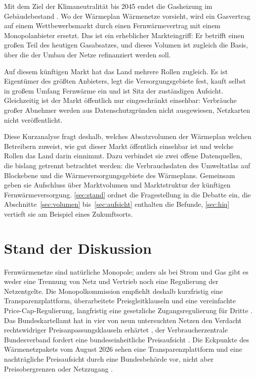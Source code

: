 \documentclass[11pt,DIV=13,a4paper,parskip=half,abstract=true,ngerman]{scrartcl}
\begin{document}
Mit dem Ziel der Klimaneutralität bis 2045 endet die Gasheizung im Gebäudebestand \parencite{herpich2023}.
Wo der Wärmeplan Wärmenetze vorsieht, wird ein Gasvertrag auf einem Wettbewerbsmarkt durch einen Fernwärmevertrag mit einem Monopolanbieter ersetzt.
Das ist ein erheblicher Markteingriff: Er betrifft einen großen Teil des heutigen Gasabsatzes, und dieses Volumen ist zugleich die Basis, über die der Umbau der Netze refinanziert werden soll.

Auf diesem künftigen Markt hat das Land mehrere Rollen zugleich.
Es ist Eigentümer des größten Anbieters, legt die Versorgungsgebiete fest, kauft selbst in großem Umfang Fernwärme ein und ist Sitz der zuständigen Aufsicht.
Gleichzeitig ist der Markt öffentlich nur eingeschränkt einsehbar: Verbräuche großer Abnehmer werden aus Datenschutzgründen nicht ausgewiesen, Netzkarten nicht veröffentlicht.

Diese Kurzanalyse fragt deshalb, welches Absatzvolumen der Wärmeplan welchen Betreibern zuweist, wie gut dieser Markt öffentlich einsehbar ist und welche Rollen das Land darin einnimmt.
Dazu verbindet sie zwei offene Datenquellen, die bislang getrennt betrachtet werden: die Verbrauchsdaten des Umweltatlas auf Blockebene und die Wärmeversorgungsgebiete des Wärmeplans.
Gemeinsam geben sie Aufschluss über Marktvolumen und Marktstruktur der künftigen Fernwärmeversorgung.
\autoref{sec:stand} ordnet die Fragestellung in die Debatte ein, die Abschnitte~\ref{sec:volumen} bis~\ref{sec:aufsicht} enthalten die Befunde, \autoref{sec:hiq} vertieft sie am Beispiel eines Zukunftsorts.

\section{Stand der Diskussion}\label{sec:stand}

Fernwärmenetze sind natürliche Monopole; anders als bei Strom und Gas gibt es weder eine Trennung von Netz und Vertrieb noch eine Regulierung der Netzentgelte.
Die Monopolkommission empfiehlt deshalb kurzfristig eine Transparenzplattform, überarbeitete Preisgleitklauseln und eine vereinfachte Price-Cap-Regulierung, langfristig eine gesetzliche Zugangsregulierung für Dritte \parencite{monopolkommission2024,monopolkommission2025}.
Das Bundeskartellamt hat in vier von neun untersuchten Netzen den Verdacht rechtswidriger Preisanpassungsklauseln erhärtet \parencite{bkarta2023,bkarta2025}, der Verbraucherzentrale Bundesverband fordert eine bundeseinheitliche Preisaufsicht \parencite{vzbv2024}.
Die Eckpunkte des Wärmenetzpakets vom August 2026 sehen eine Transparenzplattform und eine nachträgliche Preisaufsicht durch eine Bundesbehörde vor, nicht aber Preisobergrenzen oder Netzzugang \parencite{bmwe2026waermenetzpaket}.
\end{document}
